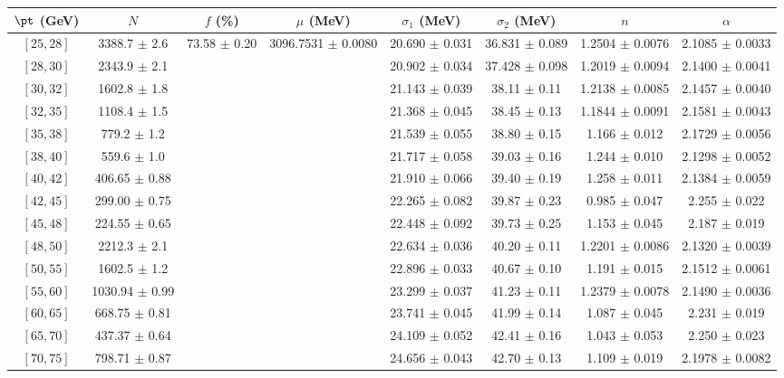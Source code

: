 \begin{tabular}{c||c|c|c|c|c|c|c}
$\pt$ (GeV) & $N$ & $f$ (\%) & $\mu$ (MeV) & $\sigma_1$ (MeV) & $\sigma_2$ (MeV) & $n$ & $\alpha$ \\
\hline
$[25, 28]$ & 3388.7 $\pm$ 2.6 & \multirow{19}{*}{73.58 $\pm$ 0.20} & \multirow{19}{*}{3096.7531 $\pm$ 0.0080} & 20.690 $\pm$ 0.031 & 36.831 $\pm$ 0.089 & 1.2504 $\pm$ 0.0076 & 2.1085 $\pm$ 0.0033\\
$[28, 30]$ & 2343.9 $\pm$ 2.1 &  &  & 20.902 $\pm$ 0.034 & 37.428 $\pm$ 0.098 & 1.2019 $\pm$ 0.0094 & 2.1400 $\pm$ 0.0041\\
$[30, 32]$ & 1602.8 $\pm$ 1.8 &  &  & 21.143 $\pm$ 0.039 & 38.11 $\pm$ 0.11 & 1.2138 $\pm$ 0.0085 & 2.1457 $\pm$ 0.0040\\
$[32, 35]$ & 1108.4 $\pm$ 1.5 &  &  & 21.368 $\pm$ 0.045 & 38.45 $\pm$ 0.13 & 1.1844 $\pm$ 0.0091 & 2.1581 $\pm$ 0.0043\\
$[35, 38]$ & 779.2 $\pm$ 1.2 &  &  & 21.539 $\pm$ 0.055 & 38.80 $\pm$ 0.15 & 1.166 $\pm$ 0.012 & 2.1729 $\pm$ 0.0056\\
$[38, 40]$ & 559.6 $\pm$ 1.0 &  &  & 21.717 $\pm$ 0.058 & 39.03 $\pm$ 0.16 & 1.244 $\pm$ 0.010 & 2.1298 $\pm$ 0.0052\\
$[40, 42]$ & 406.65 $\pm$ 0.88 &  &  & 21.910 $\pm$ 0.066 & 39.40 $\pm$ 0.19 & 1.258 $\pm$ 0.011 & 2.1384 $\pm$ 0.0059\\
$[42, 45]$ & 299.00 $\pm$ 0.75 &  &  & 22.265 $\pm$ 0.082 & 39.87 $\pm$ 0.23 & 0.985 $\pm$ 0.047 & 2.255 $\pm$ 0.022\\
$[45, 48]$ & 224.55 $\pm$ 0.65 &  &  & 22.448 $\pm$ 0.092 & 39.73 $\pm$ 0.25 & 1.153 $\pm$ 0.045 & 2.187 $\pm$ 0.019\\
$[48, 50]$ & 2212.3 $\pm$ 2.1 &  &  & 22.634 $\pm$ 0.036 & 40.20 $\pm$ 0.11 & 1.2201 $\pm$ 0.0086 & 2.1320 $\pm$ 0.0039\\
$[50, 55]$ & 1602.5 $\pm$ 1.2 &  &  & 22.896 $\pm$ 0.033 & 40.67 $\pm$ 0.10 & 1.191 $\pm$ 0.015 & 2.1512 $\pm$ 0.0061\\
$[55, 60]$ & 1030.94 $\pm$ 0.99 &  &  & 23.299 $\pm$ 0.037 & 41.23 $\pm$ 0.11 & 1.2379 $\pm$ 0.0078 & 2.1490 $\pm$ 0.0036\\
$[60, 65]$ & 668.75 $\pm$ 0.81 &  &  & 23.741 $\pm$ 0.045 & 41.99 $\pm$ 0.14 & 1.087 $\pm$ 0.045 & 2.231 $\pm$ 0.019\\
$[65, 70]$ & 437.37 $\pm$ 0.64 &  &  & 24.109 $\pm$ 0.052 & 42.41 $\pm$ 0.16 & 1.043 $\pm$ 0.053 & 2.250 $\pm$ 0.023\\
$[70, 75]$ & 798.71 $\pm$ 0.87 &  &  & 24.656 $\pm$ 0.043 & 42.70 $\pm$ 0.13 & 1.109 $\pm$ 0.019 & 2.1978 $\pm$ 0.0082\\

\end{tabular}

